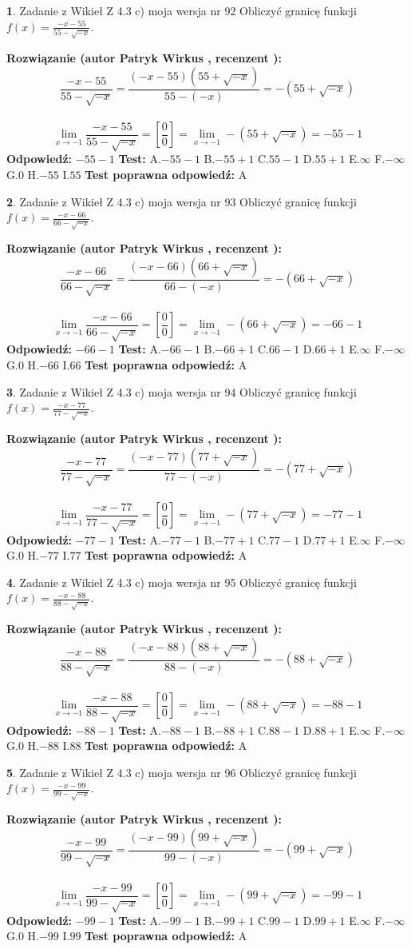 \documentclass[12pt, a4paper]{article}
\theoremstyle{definition} %
\newtheorem{zad}{}
\newcommand{\zadStart}[1]{\begin{zad}#1\newline}
\newcommand{\zadStop}{\end{zad}}
\newcommand{\rozwStart}[2]{\noindent \textbf{Rozwiązanie (autor #1 , recenzent #2): }\newline}
\newcommand{\rozwStop}{\newline}
\newcommand{\odpStart}{\noindent \textbf{Odpowiedź:}\newline}
\newcommand{\odpStop}{\newline}
\newcommand{\testStart}{\noindent \textbf{Test:}\newline}
\newcommand{\testStop}{\newline}
\newcommand{\kluczStart}{\noindent \textbf{Test poprawna odpowiedź:}\newline}
\newcommand{\kluczStop}{\newline}
\begin{document}
\zadStart{Zadanie z Wikieł Z 4.3 c) moja wersja nr 92}
Obliczyć granicę funkcji $f(x)=\frac{-x-55}{55-\sqrt{-x}}$.
\zadStop
\rozwStart{Patryk Wirkus}{}
$$\frac{-x-55}{55-\sqrt{-x}}=\frac{(-x-55)(55+\sqrt{-x})}{55-(-x)}=-(55+\sqrt{-x})$$
\\
$$\lim\limits_{x\to-1}\frac{-x-55}{55-\sqrt{-x}}=[\frac{0}{0}]=\lim\limits_{x\to-1}-(55+\sqrt{-x}) =-55-1$$
\rozwStop
\odpStart
$-55-1$
\odpStop
\testStart
A.$-55-1$
B.$-55+1$
C.$55-1$
D.$55+1$
E.$\infty$
F.$-\infty$
G.$0$
H.$-55$
I.$55$
\testStop
\kluczStart
A
\kluczStop



\zadStart{Zadanie z Wikieł Z 4.3 c) moja wersja nr 93}
Obliczyć granicę funkcji $f(x)=\frac{-x-66}{66-\sqrt{-x}}$.
\zadStop
\rozwStart{Patryk Wirkus}{}
$$\frac{-x-66}{66-\sqrt{-x}}=\frac{(-x-66)(66+\sqrt{-x})}{66-(-x)}=-(66+\sqrt{-x})$$
\\
$$\lim\limits_{x\to-1}\frac{-x-66}{66-\sqrt{-x}}=[\frac{0}{0}]=\lim\limits_{x\to-1}-(66+\sqrt{-x}) =-66-1$$
\rozwStop
\odpStart
$-66-1$
\odpStop
\testStart
A.$-66-1$
B.$-66+1$
C.$66-1$
D.$66+1$
E.$\infty$
F.$-\infty$
G.$0$
H.$-66$
I.$66$
\testStop
\kluczStart
A
\kluczStop



\zadStart{Zadanie z Wikieł Z 4.3 c) moja wersja nr 94}
Obliczyć granicę funkcji $f(x)=\frac{-x-77}{77-\sqrt{-x}}$.
\zadStop
\rozwStart{Patryk Wirkus}{}
$$\frac{-x-77}{77-\sqrt{-x}}=\frac{(-x-77)(77+\sqrt{-x})}{77-(-x)}=-(77+\sqrt{-x})$$
\\
$$\lim\limits_{x\to-1}\frac{-x-77}{77-\sqrt{-x}}=[\frac{0}{0}]=\lim\limits_{x\to-1}-(77+\sqrt{-x}) =-77-1$$
\rozwStop
\odpStart
$-77-1$
\odpStop
\testStart
A.$-77-1$
B.$-77+1$
C.$77-1$
D.$77+1$
E.$\infty$
F.$-\infty$
G.$0$
H.$-77$
I.$77$
\testStop
\kluczStart
A
\kluczStop



\zadStart{Zadanie z Wikieł Z 4.3 c) moja wersja nr 95}
Obliczyć granicę funkcji $f(x)=\frac{-x-88}{88-\sqrt{-x}}$.
\zadStop
\rozwStart{Patryk Wirkus}{}
$$\frac{-x-88}{88-\sqrt{-x}}=\frac{(-x-88)(88+\sqrt{-x})}{88-(-x)}=-(88+\sqrt{-x})$$
\\
$$\lim\limits_{x\to-1}\frac{-x-88}{88-\sqrt{-x}}=[\frac{0}{0}]=\lim\limits_{x\to-1}-(88+\sqrt{-x}) =-88-1$$
\rozwStop
\odpStart
$-88-1$
\odpStop
\testStart
A.$-88-1$
B.$-88+1$
C.$88-1$
D.$88+1$
E.$\infty$
F.$-\infty$
G.$0$
H.$-88$
I.$88$
\testStop
\kluczStart
A
\kluczStop



\zadStart{Zadanie z Wikieł Z 4.3 c) moja wersja nr 96}
Obliczyć granicę funkcji $f(x)=\frac{-x-99}{99-\sqrt{-x}}$.
\zadStop
\rozwStart{Patryk Wirkus}{}
$$\frac{-x-99}{99-\sqrt{-x}}=\frac{(-x-99)(99+\sqrt{-x})}{99-(-x)}=-(99+\sqrt{-x})$$
\\
$$\lim\limits_{x\to-1}\frac{-x-99}{99-\sqrt{-x}}=[\frac{0}{0}]=\lim\limits_{x\to-1}-(99+\sqrt{-x}) =-99-1$$
\rozwStop
\odpStart
$-99-1$
\odpStop
\testStart
A.$-99-1$
B.$-99+1$
C.$99-1$
D.$99+1$
E.$\infty$
F.$-\infty$
G.$0$
H.$-99$
I.$99$
\testStop
\kluczStart
A
\kluczStop
\end{document}
